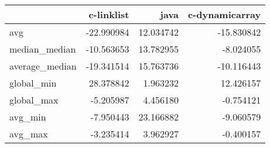 \begin{tabular}{lrrr}
\toprule
{} &  c-linklist &       java &  c-dynamicarray \\
\midrule
avg            &  -22.990984 &  12.034742 &      -15.830842 \\
median\_median  &  -10.563653 &  13.782955 &       -8.024055 \\
average\_median &  -19.341514 &  15.763736 &      -10.116443 \\
global\_min     &   28.378842 &   1.963232 &       12.426157 \\
global\_max     &   -5.205987 &   4.456180 &       -0.754121 \\
avg\_min        &   -7.950443 &  23.166882 &       -9.060579 \\
avg\_max        &   -3.235414 &   3.962927 &       -0.400157 \\
\bottomrule
\end{tabular}
